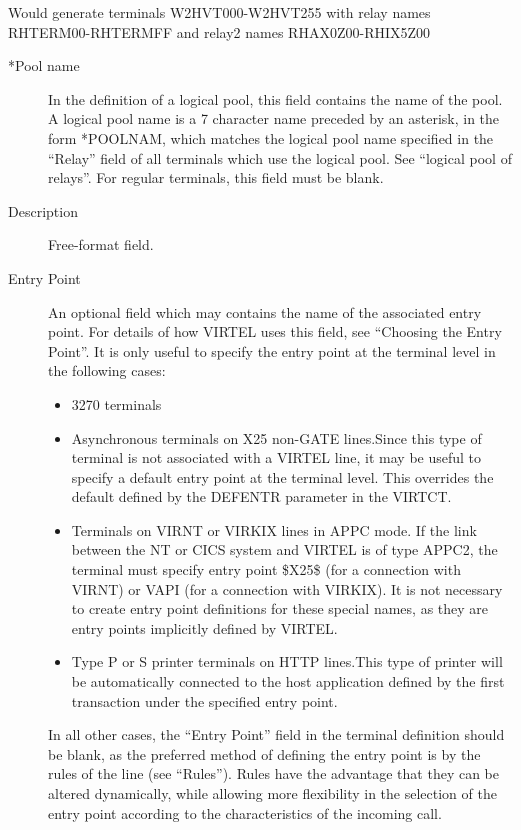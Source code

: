 \documentclass[letterpaper,10pt,english]{sphinxmanual}
\begin{document}
Would generate terminals W2HVT000-W2HVT255 with relay names RHTERM00-RHTERMFF and relay2 names RHAX0Z00-RHIX5Z00
\begin{description}
\item[{*Pool name}] \leavevmode
In the definition of a logical pool, this field contains the name of the pool. A logical pool name is a 7 character name preceded by an asterisk, in the form *POOLNAM, which matches the logical pool name specified in the “Relay” field of all terminals which use the logical pool. See “logical pool of relays”. For regular terminals, this field must be blank.

\item[{Description}] \leavevmode
Free-format field.

\item[{Entry Point}] \leavevmode
An optional field which may contains the name of the associated entry point. For details of how VIRTEL uses this field, see “Choosing the Entry Point”. It is only useful to specify the entry point at the terminal level in the following cases:
\begin{itemize}
\item {} 
3270 terminals

\item {} 
Asynchronous terminals on X25 non-GATE lines.Since this type of terminal is not associated with a VIRTEL line, it may be useful to specify a default entry point at the terminal level. This overrides the default defined by the DEFENTR parameter in the VIRTCT.

\item {} 
Terminals on VIRNT or VIRKIX lines in APPC mode. If the link between the NT or CICS system and VIRTEL is of type APPC2, the terminal must specify entry point \$X25\$ (for a connection with VIRNT) or VAPI (for a connection with VIRKIX). It is not necessary to create entry point definitions for these special names, as they are entry points implicitly defined by VIRTEL.

\item {} 
Type P or S printer terminals on HTTP lines.This type of printer will be automatically connected to the host application defined by the first transaction under the specified entry point.

\end{itemize}

In all other cases, the “Entry Point” field in the terminal definition should be blank, as the preferred method of defining the entry point is by the rules of the line (see “Rules”). Rules have the advantage that they can be
altered dynamically, while allowing more flexibility in the selection of the entry point according to the characteristics of the incoming call.


\end{description}
\end{document}
